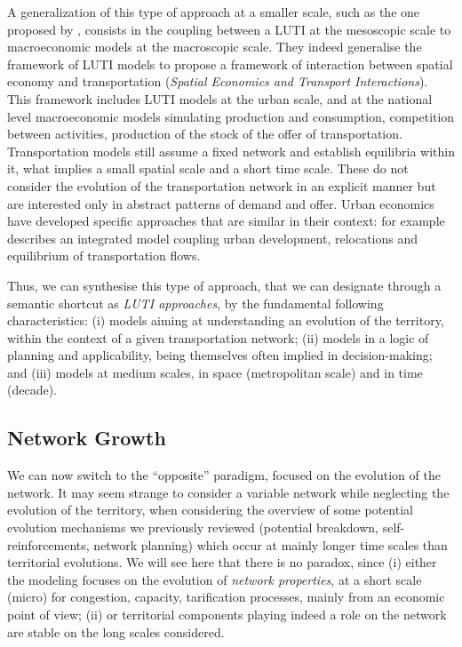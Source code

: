 \documentclass[10pt]{article}
\begin{document}
A generalization of this type of approach at a smaller scale, such as the one proposed by \cite{russo2012unifying}, consists in the coupling between a LUTI at the mesoscopic scale to macroeconomic models at the macroscopic scale. They indeed generalise the framework of LUTI models to propose a framework of interaction between spatial economy and transportation (\emph{Spatial Economics and Transport Interactions}). This framework includes LUTI models at the urban scale, and at the national level macroeconomic models simulating production and consumption, competition between activities, production of the stock of the offer of transportation. Transportation models still assume a fixed network and establish equilibria within it, what implies a small spatial scale and a short time scale. These do not consider the evolution of the transportation network in an explicit manner but are interested only in abstract patterns of demand and offer. Urban economics have developed specific approaches that are similar in their context: \cite{masso2000} for example describes an integrated model coupling urban development, relocations and equilibrium of transportation flows.

\cite{wilson1998land}

Thus, we can synthesise this type of approach, that we can designate through a semantic shortcut as \emph{LUTI approaches}, by the fundamental following characteristics: (i) models aiming at understanding an evolution of the territory, within the context of a given transportation network; (ii) models in a logic of planning and applicability, being themselves often implied in decision-making; and (iii) models at medium scales, in space (metropolitan scale) and in time (decade).


\subsection{Network Growth}

We can now switch to the ``opposite'' paradigm, focused on the evolution of the network. It may seem strange to consider a variable network while neglecting the evolution of the territory, when considering the overview of some potential evolution mechanisms we previously reviewed (potential breakdown, self-reinforcements, network planning) which occur at mainly longer time scales than territorial evolutions. We will see here that there is no paradox, since (i) either the modeling focuses on the evolution of \emph{network properties}, at a short scale (micro) for congestion, capacity, tarification processes, mainly from an economic point of view; (ii) or territorial components playing indeed a role on the network are stable on the long scales considered.
\end{document}
